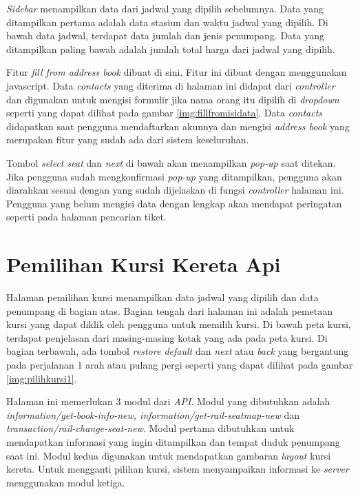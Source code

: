 \textit{Sidebar} menampilkan data dari jadwal yang dipilih sebelumnya. Data yang ditampilkan pertama adalah data stasiun dan waktu jadwal yang dipilih. Di bawah data jadwal, terdapat data jumlah dan jenis penumpang. Data yang ditampilkan paling bawah adalah jumlah total harga dari jadwal yang dipilih.

Fitur \textit{fill from address book} dibuat di sini. Fitur ini dibuat dengan menggunakan javascript. Data \textit{contacts} yang diterima di halaman ini didapat dari \textit{controller} dan digunakan untuk mengisi formulir jika nama orang itu dipilih di \textit{dropdown} seperti yang dapat dilihat pada gambar \ref{img:fillfromisidata}. Data \textit{contacts} didapatkan saat pengguna mendaftarkan akunnya dan mengisi \textit{address book} yang merupakan fitur yang sudah ada dari sistem keseluruhan.

Tombol \textit{select seat} dan \textit{next} di bawah akan menampilkan \textit{pop-up} saat ditekan. Jika pengguna sudah mengkonfirmasi \textit{pop-up} yang ditampilkan, pengguna akan diarahkan sesuai dengan yang sudah dijelaskan di fungsi \textit{controller} halaman ini. Pengguna yang belum mengisi data dengan lengkap akan mendapat peringatan seperti pada halaman pencarian tiket.

\section{Pemilihan Kursi Kereta Api}
\label{sec:pemilihankursi}

Halaman pemilihan kursi menampilkan data jadwal yang dipilih dan data penumpang di bagian atas. Bagian tengah dari halaman ini adalah pemetaan kursi yang dapat diklik oleh pengguna untuk memilih kursi. Di bawah peta kursi, terdapat penjelasan dari masing-masing kotak yang ada pada peta kursi. Di bagian terbawah, ada tombol \textit{restore default} dan \textit{next} atau \textit{back} yang bergantung pada perjalanan 1 arah atau pulang pergi seperti yang dapat dilihat pada gambar \ref{img:pilihkursi1}.

Halaman ini memerlukan 3 modul dari \textit{API}. Modul yang dibutuhkan adalah \textit{information/get-book-info-new, information/get-rail-seatmap-new} dan \textit{transaction/rail-change-seat-new}. Modul pertama dibutuhkan untuk mendapatkan informasi yang ingin ditampilkan dan tempat duduk penumpang saat ini. Modul kedua digunakan untuk mendapatkan gambaran \textit{layout} kursi kereta. Untuk mengganti pilihan kursi, sistem menyampaikan informasi ke \textit{server} menggunakan modul ketiga.

